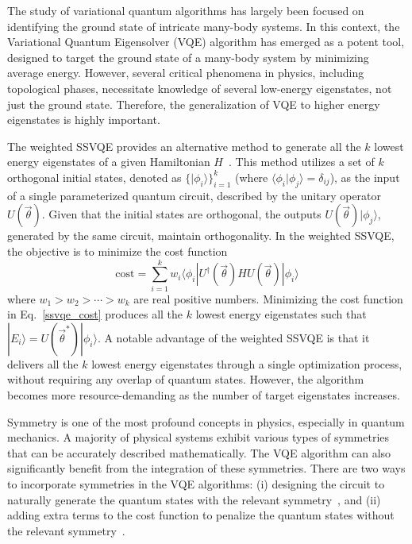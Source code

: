 The study of variational quantum algorithms has largely been focused on identifying the ground state of intricate many-body systems. In this context, the Variational Quantum Eigensolver (VQE) algorithm has emerged as a potent tool, designed to target the ground state of a many-body system by minimizing average energy. However, several critical phenomena in physics, including topological phases, necessitate knowledge of several low-energy eigenstates, not just the ground state. Therefore, the generalization of VQE to higher energy eigenstates is highly important. 

The weighted SSVQE provides an alternative method to generate all the $k$ lowest energy eigenstates of a given Hamiltonian $H$~\cite{?}. This method utilizes a set of $k$ orthogonal initial states, denoted as $\{|\phi_{i}\rangle\}_{i=1}^{k}$ (where $\langle \phi_{i} | \phi_{j} \rangle = \delta_{ij}$), as the input of a single parameterized quantum circuit, described by the unitary operator $U(\vec{\theta})$. Given that the initial states are orthogonal, the outputs $U(\vec{\theta})| \phi_{j} \rangle$, generated by the same circuit, maintain orthogonality. In the weighted SSVQE, the objective is to minimize the cost function  
\begin{equation}
    \mathrm{cost} = \sum_{i=1}^{k} w_{i} \langle \phi_{i}| U^{\dagger}(\vec{\theta}) H U(\vec{\theta}) | \phi_{i} \rangle
    \label{ssvqe_cost}
\end{equation}
where $w_1 > w_2 > \cdots > w_k$ are real positive numbers. Minimizing the cost function in Eq.~\eqref{ssvqe_cost} produces all the $k$ lowest energy eigenstates such that $|E_{i}\rangle = U(\vec{\theta}^{*})|\phi_{i}\rangle$. 
A notable advantage of the weighted SSVQE is that it delivers all the $k$ lowest energy eigenstates through a single optimization process, without requiring any overlap of quantum states. However, the algorithm becomes more resource-demanding as the number of target eigenstates increases. 

Symmetry is one of the most profound concepts in physics, especially in quantum mechanics. A majority of physical systems exhibit various types of symmetries that can be accurately described mathematically. The VQE algorithm can also significantly benefit from the integration of these symmetries. There are two ways to incorporate symmetries in the VQE algorithms: (i) designing the circuit to naturally generate the quantum states with the relevant symmetry~\cite{?}, and (ii) adding extra terms to the cost function to penalize the quantum states without the relevant symmetry~\cite{?}. 
  

